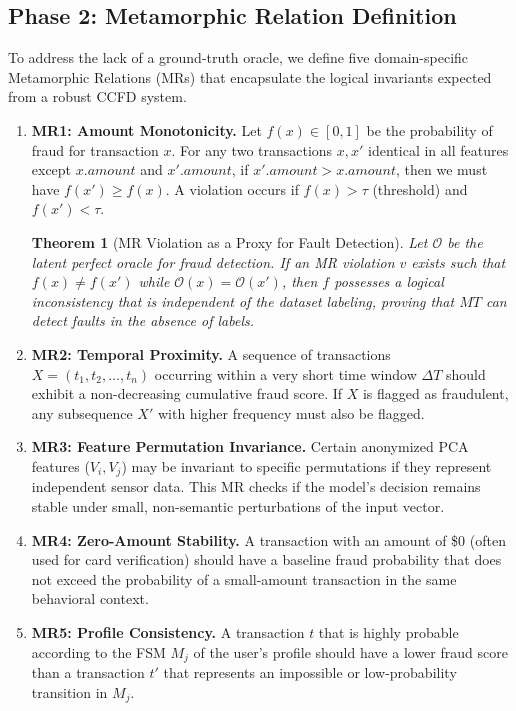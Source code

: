 \documentclass[review]{elsarticle}
\newtheorem{theorem}{Theorem}
\begin{document}
\subsection{Phase 2: Metamorphic Relation Definition}
To address the lack of a ground-truth oracle, we define five domain-specific Metamorphic Relations (MRs) that encapsulate the logical invariants expected from a robust CCFD system.

\begin{enumerate}
    \item \textbf{MR1: Amount Monotonicity.} Let $f(x) \in [0,1]$ be the probability of fraud for transaction $x$. For any two transactions $x, x'$ identical in all features except $x.amount$ and $x'.amount$, if $x'.amount > x.amount$, then we must have $f(x') \geq f(x)$. A violation occurs if $f(x) > \tau$ (threshold) and $f(x') < \tau$.

    \begin{theorem}[MR Violation as a Proxy for Fault Detection]
    Let $\mathcal{O}$ be the latent perfect oracle for fraud detection. If an MR violation $v$ exists such that $f(x) \neq f(x')$ while $\mathcal{O}(x) = \mathcal{O}(x')$, then $f$ possesses a logical inconsistency that is independent of the dataset labeling, proving that $MT$ can detect faults in the absence of labels.
    \end{theorem}
    \item \textbf{MR2: Temporal Proximity.} A sequence of transactions $X = (t_1, t_2, \dots, t_n)$ occurring within a very short time window $\Delta T$ should exhibit a non-decreasing cumulative fraud score. If $X$ is flagged as fraudulent, any subsequence $X'$ with higher frequency must also be flagged.
    \item \textbf{MR3: Feature Permutation Invariance.} Certain anonymized PCA features ($V_i, V_j$) may be invariant to specific permutations if they represent independent sensor data. This MR checks if the model's decision remains stable under small, non-semantic perturbations of the input vector.
    \item \textbf{MR4: Zero-Amount Stability.} A transaction with an amount of \$0 (often used for card verification) should have a baseline fraud probability that does not exceed the probability of a small-amount transaction in the same behavioral context.
    \item \textbf{MR5: Profile Consistency.} A transaction $t$ that is highly probable according to the FSM $M_j$ of the user's profile should have a lower fraud score than a transaction $t'$ that represents an impossible or low-probability transition in $M_j$.
\end{enumerate}
\end{document}
